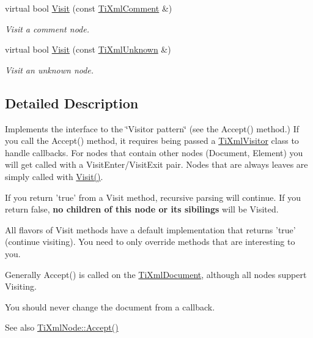 \begin{DoxyCompactItemize}
virtual bool \hyperlink{class_ti_xml_visitor_a53a60e7a528627b31af3161972cc7fa2}{Visit} (const \hyperlink{class_ti_xml_comment}{Ti\+Xml\+Comment} \&)
\begin{DoxyCompactList}\small\item\em Visit a comment node. \end{DoxyCompactList}\item 
virtual bool \hyperlink{class_ti_xml_visitor_a7e284d607d275c51dac1adb58159ce28}{Visit} (const \hyperlink{class_ti_xml_unknown}{Ti\+Xml\+Unknown} \&)
\begin{DoxyCompactList}\small\item\em Visit an unknown node. \end{DoxyCompactList}\end{DoxyCompactItemize}


\subsection{Detailed Description}
Implements the interface to the \char`\"{}\+Visitor pattern\char`\"{} (see the Accept() method.) If you call the Accept() method, it requires being passed a \hyperlink{class_ti_xml_visitor}{Ti\+Xml\+Visitor} class to handle callbacks. For nodes that contain other nodes (Document, Element) you will get called with a Visit\+Enter/\+Visit\+Exit pair. Nodes that are always leaves are simply called with \hyperlink{class_ti_xml_visitor_afad71c71ce6473fb9b4b64cd92de4a19}{Visit()}.

If you return 'true' from a Visit method, recursive parsing will continue. If you return false, {\bfseries no children of this node or its sibilings} will be Visited.

All flavors of Visit methods have a default implementation that returns 'true' (continue visiting). You need to only override methods that are interesting to you.

Generally Accept() is called on the \hyperlink{class_ti_xml_document}{Ti\+Xml\+Document}, although all nodes suppert Visiting.

You should never change the document from a callback.

\begin{DoxySeeAlso}{See also}
\hyperlink{class_ti_xml_node_acc0f88b7462c6cb73809d410a4f5bb86}{Ti\+Xml\+Node\+::\+Accept()} 
\end{DoxySeeAlso}


